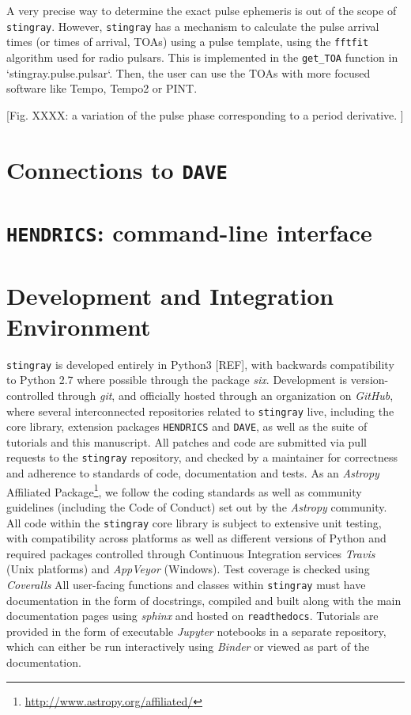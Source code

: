 \documentclass[12pt]{emulateapj}
\newcommand{\stingray}{\texttt{stingray}\xspace}
\newcommand{\hendrics}{\texttt{HENDRICS}\xspace}
\begin{document}
A very precise way to determine the exact pulse ephemeris is out of the scope of \stingray. 
However, \stingray has a mechanism to calculate the pulse arrival times (or times of arrival, TOAs) using a pulse template, using the \texttt{fftfit} algorithm used for radio pulsars. 
This is implemented in the \verb|get_TOA| function in `stingray.pulse.pulsar`.
Then, the user can use the TOAs with more focused software like Tempo, Tempo2 or PINT.

[Fig. XXXX: a variation of the pulse phase corresponding to a period derivative. ]

\section{Connections to \texttt{DAVE}}
\label{sec:dave}

\section{\hendrics: command-line interface}
\label{sec:hendrics}


\section{Development and Integration Environment}
\label{sec:development}

\stingray is developed entirely in Python3 [REF], with backwards compatibility to Python 2.7 where possible through the package \textit{six}. Development is version-controlled through \textit{git}, and officially hosted through an organization on \textit{GitHub}, where several interconnected repositories related to \stingray live, including the core library, extension packages \hendrics and \texttt{DAVE}, as well as the suite of tutorials and this manuscript. All patches and code are submitted via pull requests to the \stingray repository, and checked by a maintainer for correctness and adherence to standards of code, documentation and tests. As an \textit{Astropy} Affiliated Package\footnote{\url{http://www.astropy.org/affiliated/}}, we follow the coding standards as well as community guidelines (including the Code of Conduct) set out by the \textit{Astropy} community. 
All code within the \stingray core library is subject to extensive unit testing, with compatibility across platforms as well as different versions of Python and required packages controlled through Continuous Integration services \textit{Travis} (Unix platforms) and \textit{AppVeyor} (Windows). Test coverage is checked using \textit{Coveralls}
All user-facing functions and classes within \stingray must have documentation in the form of docstrings, compiled and built along with the main documentation pages using \textit{sphinx} and hosted on \texttt{readthedocs}. Tutorials are provided in the form of executable \textit{Jupyter} notebooks in a separate repository, which can either be run interactively using \textit{Binder} or viewed as part of the documentation. 
\end{document}

